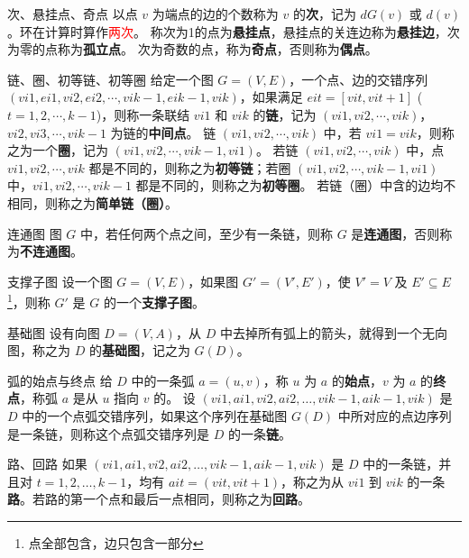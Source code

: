 	\begin{dfnbox}{次、悬挂点、奇点}{}
		以点 \( v \) 为端点的边的个数称为 \( v \) 的\textbf{次}，记为 \( dG(v) \) 或 \( d(v) \)。环在计算时算作\textcolor{red}{两次}。
		称次为1的点为\textbf{悬挂点}，悬挂点的关连边称为\textbf{悬挂边}，次为零的点称为\textbf{孤立点}。
		次为奇数的点，称为\textbf{奇点}，否则称为\textbf{偶点}。
	\end{dfnbox}
	\begin{dfnbox}{链、圈、初等链、初等圈}{}
		给定一个图 \( G = (V, E) \)，一个点、边的交错序列 \((vi1, ei1, vi2, ei2, \cdots, vik-1, eik-1, vik)\)，如果满足 \( eit = [vit, vit+1] \) (\( t=1, 2, \cdots, k-1 \))，则称一条联结 \( vi1 \) 和 \( vik \) 的\textbf{链}，记为 \((vi1, vi2, \cdots, vik)\)，\( vi2, vi3, \cdots, vik-1 \) 为链的\textbf{中间点}。
		链 \((vi1, vi2, \cdots, vik)\) 中，若 \( vi1 = vik \)，则称之为一个\textbf{圈}，记为 \((vi1, vi2, \cdots, vik-1, vi1)\)。
		若链 \((vi1, vi2, \cdots, vik)\) 中，点 \( vi1, vi2, \cdots, vik \) 都是不同的，则称之为\textbf{初等链}；若圈 \((vi1, vi2, \cdots, vik-1, vi1)\) 中，\( vi1, vi2, \cdots, vik-1 \) 都是不同的，则称之为\textbf{初等圈}。
		若链（圈）中含的边均不相同，则称之为\textbf{简单链（圈）}。
	\end{dfnbox}
	\begin{dfnbox}{连通图}{}
		图 \( G \) 中，若任何两个点之间，至少有一条链，则称 \( G \) 是\textbf{连通图}，否则称为\textbf{不连通图}。
	\end{dfnbox}
	\begin{dfnbox}{支撑子图}{}
		设一个图 \( G = (V, E) \)，如果图 \( G' = (V', E') \)，使 \( V' = V \) 及 \( E' \subseteq E \)\footnote{点全部包含，边只包含一部分}，则称 \( G' \) 是 \( G \) 的一个\textbf{支撑子图}。
	\end{dfnbox}
	\begin{dfnbox}{基础图}{}
		设有向图 \( D = (V, A) \)，从 \( D \) 中去掉所有弧上的箭头，就得到一个无向图，称之为 \( D \) 的\textbf{基础图}，记之为 \( G(D) \)。
	\end{dfnbox}
	\begin{dfnbox}{弧的始点与终点}{}
	给 \( D \) 中的一条弧 \( a = (u, v) \)，称 \( u \) 为 \( a \) 的\textbf{始点}，\( v \) 为 \( a \) 的\textbf{终点}，称弧 \( a \) 是从 \( u \) 指向 \( v \) 的。
	设 \( (vi1, ai1, vi2, ai2, \ldots, vik-1, aik-1, vik) \) 是 \( D \) 中的一个点弧交错序列，如果这个序列在基础图 \( G(D) \) 中所对应的点边序列是一条链，则称这个点弧交错序列是 \( D \) 的一条\textbf{链}。
	\end{dfnbox}
	\begin{dfnbox}{路、回路}{}
	如果 \( (vi1, ai1, vi2, ai2, \ldots, vik-1, aik-1, vik) \) 是 \( D \) 中的一条链，并且对 \( t = 1, 2, \ldots, k-1 \)，均有 \( ait = (vit, vit+1) \)，称之为从 \( vi1 \) 到 \( vik \) 的一条\textbf{路}。若路的第一个点和最后一点相同，则称之为\textbf{回路}。
	\end{dfnbox}



